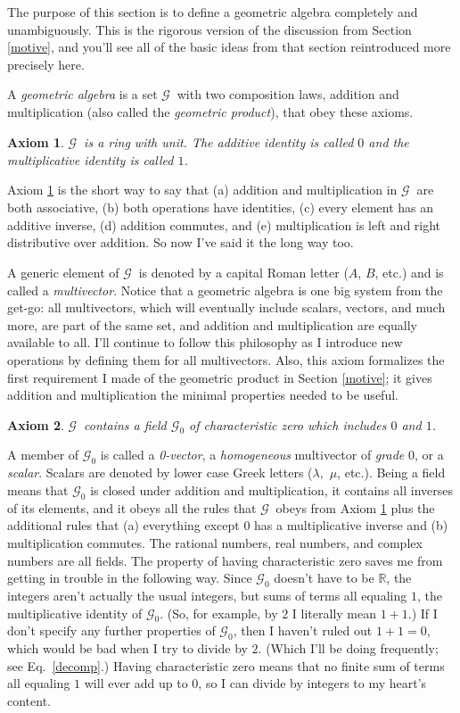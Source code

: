 \documentclass{utarticle}
\newcommand{\G}[1][]{\ensuremath{\mathcal{G}_{#1}}}
\newtheorem{axiom}{Axiom}
\begin{document}
The purpose of this section is to define a geometric algebra completely and 
unambiguously.  This is the rigorous version of the discussion from Section 
\ref{motive}, and you'll see all of the basic ideas from that section reintroduced
more precisely here.

A \emph{geometric algebra} is a set \G\ with two composition laws,
addition and multiplication (also called the \emph{geometric
product}), that obey these axioms.

\begin{axiom}
\G\ is a ring with unit.  The additive identity is called $0$ and 
the multiplicative identity is called $1$.
\label{ring}
\end{axiom}

Axiom \ref{ring} is the short way to say that (a) addition and 
multiplication in \G\ are both associative, (b) both operations 
have identities, (c) every element has an additive inverse, (d) 
addition commutes, and (e) multiplication is left and right 
distributive over addition.  So now I've said it the long way too.

A generic element of \G\ is denoted by a capital Roman letter 
($A$, $B$, etc.) and is called a \emph{multivector}.  Notice that a 
geometric algebra is one big system from the get-go:  all multivectors, 
which will eventually include scalars, vectors, and much more, are 
part of the same set, and addition and multiplication are equally 
available to all.  I'll continue to follow this philosophy as I introduce new 
operations by defining them for all multivectors.  Also, this axiom 
formalizes the first requirement I made of the geometric product in 
Section \ref{motive}; it gives addition and multiplication the minimal properties
needed to be useful.

\begin{axiom}
\G\ contains a field \G[0] of characteristic zero which includes $0$ 
and $1$.
\label{scalars}
\end{axiom}

A member of \G[0] is called a \emph{0-vector}, a \emph{homogeneous} 
multivector of \emph{grade} $0$, or a \emph{scalar}.  Scalars are 
denoted by lower case Greek letters ($\lambda,$ $\mu$, etc.).  Being a 
field means that \G[0] is closed under addition and multiplication, 
it contains all inverses of its elements, and it obeys all the rules that 
\G\ obeys from Axiom \ref{ring} plus the additional rules that (a) 
everything except $0$ has a multiplicative inverse and (b) multiplication 
commutes.  The rational numbers, real numbers, and complex numbers 
are all fields.  The property of having characteristic zero saves me
from getting in trouble in the following way.  Since \G[0] doesn't have to be
$\mathbb{R}$, the integers aren't actually
the usual integers, but sums of terms all equaling $1$, the multiplicative 
identity of \G[0].  (So, for example, by $2$ I literally mean $1+1$.)  If I 
don't specify any further properties of \G[0], then I haven't ruled out  
$1+1=0$, which would be bad when I try to divide by $2$.  (Which I'll
be doing frequently; see Eq.~\eqref{decomp}.)  Having characteristic 
zero means that no finite sum of terms all equaling $1$ will ever add up to $0$, 
so I can divide by integers to my heart's content.
\end{document}
